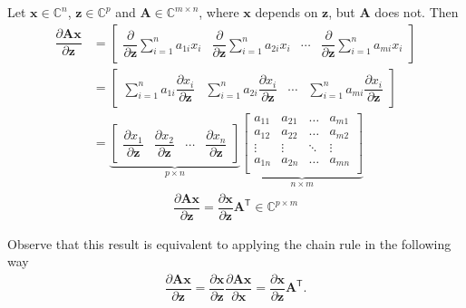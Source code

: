 \documentclass{article}
\newcommand{\trans}{\mathsf{T}}
\begin{document}
Let \(\mathbf{x} \in \mathbb{C}^{n}\), \(\mathbf{z} \in \mathbb{C}^{p}\) and \(\mathbf{A} \in \mathbb{C}^{m\times n}\), where \(\mathbf{x}\) depends on \(\mathbf{z}\), but \(\mathbf{A}\) does not. Then
\begin{align}
    \dfrac{\partial \mathbf{A}  \mathbf{x}}{\partial \mathbf{z}} & =
    \begin{bmatrix}
        \dfrac{\partial}{\partial \mathbf{z}}\sum_{i=1}^{n} a_{1i}x_i & \dfrac{\partial}{\partial \mathbf{z}}\sum_{i=1}^{n} a_{2i}x_i & \cdots & \dfrac{\partial}{\partial \mathbf{z}}\sum_{i=1}^{n} a_{mi}x_i
    \end{bmatrix} \\
    & = \begin{bmatrix}
        \sum_{i=1}^{n} a_{1i}\dfrac{\partial x_i}{\partial \mathbf{z}} & \sum_{i=1}^{n} a_{2i}\dfrac{\partial x_i}{\partial \mathbf{z}} & \cdots & \sum_{i=1}^{n} a_{mi}\dfrac{\partial x_i}{\partial \mathbf{z}}
    \end{bmatrix} \\
    & = \underbrace{\begin{bmatrix}
        \dfrac{\partial x_1}{\partial \mathbf{z}} & \dfrac{\partial x_2}{\partial \mathbf{z}} & \cdots & \dfrac{\partial x_n}{\partial \mathbf{z}}
    \end{bmatrix}}_{p \times n}
    \underbrace{\begin{bmatrix}
        a_{11} & a_{21} & \dots & a_{m1} \\
        a_{12} & a_{22} & \dots & a_{m2} \\
        \vdots & \vdots & \ddots & \vdots \\
        a_{1n} & a_{2n} & \dots & a_{mn} \\
    \end{bmatrix}}_{n \times m}
\end{align}
\begin{align}
    \boxed{\dfrac{\partial \mathbf{A}  \mathbf{x}}{\partial \mathbf{z}} = \dfrac{\partial \mathbf{x}}{\partial \mathbf{z}} \mathbf{A}^\trans \in \mathbb{C}^{p \times m}}
\end{align}

Observe that this result is equivalent to applying the chain rule in the following way
\begin{align}
    \dfrac{\partial \mathbf{A}  \mathbf{x}}{\partial \mathbf{z}} = \dfrac{\partial \mathbf{x}}{\partial \mathbf{z}} \dfrac{\partial \mathbf{A}  \mathbf{x}}{\partial \mathbf{x}} = \dfrac{\partial \mathbf{x}}{\partial \mathbf{z}} \mathbf{A}^\trans.
\end{align}
\end{document}
